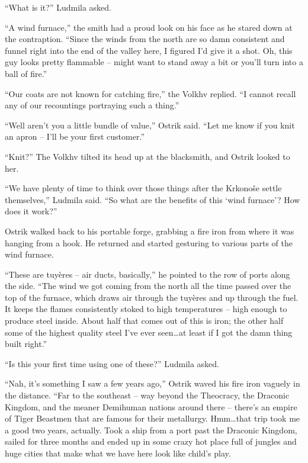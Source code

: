  

“What is it?” Ludmila asked.

 

“A wind furnace,” the smith had a proud look on his face as he stared down at the contraption. “Since the winds from the north are so damn consistent and funnel right into the end of the valley here, I figured I’d give it a shot. Oh, this guy looks pretty flammable – might want to stand away a bit or you’ll turn into a ball of fire.”

 

“Our coats are not known for catching fire,” the Volkhv replied. “I cannot recall any of our recountings portraying such a thing.”

 

“Well aren’t you a little bundle of value,” Ostrik said. “Let me know if you knit an apron – I’ll be your first customer.”

 

“Knit?” The Volkhv tilted its head up at the blacksmith, and Ostrik looked to her.

 

“We have plenty of time to think over those things after the Krkonoše settle themselves,” Ludmila said. “So what are the benefits of this ‘wind furnace’? How does it work?”

 

Ostrik walked back to his portable forge, grabbing a fire iron from where it was hanging from a hook. He returned and started gesturing to various parts of the wind furnace.

 

“These are tuyères – air ducts, basically,” he pointed to the row of ports along the side. “The wind we got coming from the north all the time passed over the top of the furnace, which draws air through the tuyères and up through the fuel. It keeps the flames consistently stoked to high temperatures – high enough to produce steel inside. About half that comes out of this is iron; the other half some of the highest quality steel I’ve ever seen…at least if I got the damn thing built right.”

 

“Is this your first time using one of these?” Ludmila asked.

 

“Nah, it’s something I saw a few years ago,” Ostrik waved his fire iron vaguely in the distance. “Far to the southeast – way beyond the Theocracy, the Draconic Kingdom, and the meaner Demihuman nations around there – there’s an empire of Tiger Beastmen that are famous for their metallurgy. Hmm…that trip took me a good two years, actually. Took a ship from a port past the Draconic Kingdom, sailed for three months and ended up in some crazy hot place full of jungles and huge cities that make what we have here look like child’s play.

